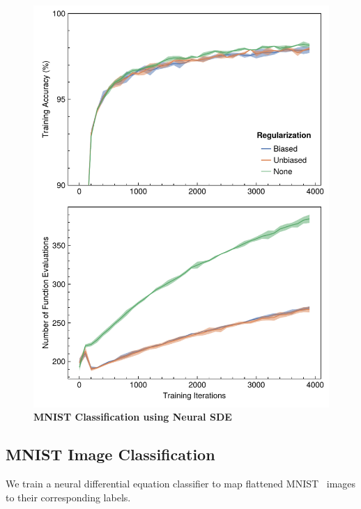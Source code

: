 \begin{figure}[t]
\begin{minipage}[c]{0.49\textwidth}
    \includegraphics[width=\linewidth]{../figures/local_regularizing_neural_des/mnist_sde.pdf}
    \caption{\textbf{MNIST Classification using Neural SDE}}
    \label{fig:mnist_nsde_localreg}
  \end{minipage}
\end{figure}


\subsection{MNIST Image Classification}
\label{subsec:mnist}

We train a neural differential equation classifier to map flattened MNIST~\citep{lecun1998gradient} images to their corresponding labels.

